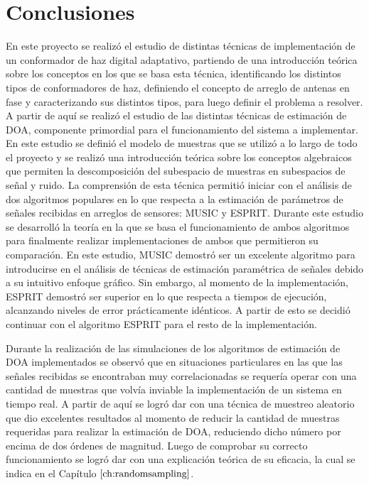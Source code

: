 \chapter{Conclusiones}\label{ch:conclusiones}

En este proyecto se realizó el estudio de distintas técnicas de implementación de un conformador de haz digital adaptativo, partiendo de una introducción teórica sobre los conceptos en los que se basa esta técnica, identificando los distintos tipos de conformadores de haz, definiendo el concepto de arreglo de antenas en fase y caracterizando sus distintos tipos, para luego definir el problema a resolver. A partir de aquí se realizó el estudio de las distintas técnicas de estimación de DOA, componente primordial para el funcionamiento del sistema a implementar. En este estudio se definió el modelo de muestras que se utilizó a lo largo de todo el proyecto y se realizó una introducción teórica sobre los conceptos algebraicos que permiten la descomposición del subespacio de muestras en subespacios de señal y ruido. La comprensión de esta técnica permitió iniciar con el análisis de dos algoritmos populares en lo que respecta a la estimación de parámetros de señales recibidas en arreglos de sensores: MUSIC y ESPRIT. Durante este estudio se desarrolló la teoría en la que se basa el funcionamiento de ambos algoritmos para finalmente realizar implementaciones de ambos que permitieron su comparación. En este estudio, MUSIC demostró ser un excelente algoritmo para introducirse en el análisis de técnicas de estimación paramétrica de señales debido a su intuitivo enfoque gráfico. Sin embargo, al momento de la implementación, ESPRIT demostró ser superior en lo que respecta a tiempos de ejecución, alcanzando niveles de error prácticamente idénticos. A partir de esto se decidió continuar con el algoritmo ESPRIT para el resto de la implementación.

Durante la realización de las simulaciones de los algoritmos de estimación de DOA implementados se observó que en situaciones particulares en las que las señales recibidas se encontraban muy correlacionadas se requería operar con una cantidad de muestras que volvía inviable la implementación de un sistema en tiempo real. A partir de aquí se logró dar con una técnica de muestreo aleatorio que dio excelentes resultados al momento de reducir la cantidad de muestras requeridas para realizar la estimación de DOA, reduciendo dicho número por encima de dos órdenes de magnitud. Luego de comprobar su correcto funcionamiento se logró dar con una explicación teórica de su eficacia, la cual se indica en el Capítulo $\ref{ch:randomsampling}$.

